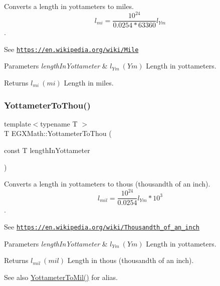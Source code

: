 Converts a length in yottameters to miles. \[ l_{mi}=\frac{10^{24}}{0.0254 * 63360} l_{Ym} \]. 

See \href{https://en.wikipedia.org/wiki/Mile}{\tt https\+://en.\+wikipedia.\+org/wiki/\+Mile} 
\begin{DoxyParams}{Parameters}
{\em length\+In\+Yottameter} & $ l_{Ym}\ (Ym)$ Length in yottameters. \\
\hline
\end{DoxyParams}
\begin{DoxyReturn}{Returns}
$ l_{mi}\ (mi)$ Length in miles. 
\end{DoxyReturn}
\mbox{\label{group___e_g_x_math-_conversions-_length_conversions-_s_i-_yottameter-_imperial_ga9bf8eeca799b8246932d4aeaac425d87}} 
\subsubsection{\texorpdfstring{Yottameter\+To\+Thou()}{YottameterToThou()}}
{\footnotesize\ttfamily template$<$typename T $>$ \\
T E\+G\+X\+Math\+::\+Yottameter\+To\+Thou (\begin{DoxyParamCaption}\item[{const T}]{length\+In\+Yottameter }\end{DoxyParamCaption})}



Converts a length in yottameters to thous (thousandth of an inch). \[ l_{mil}= \frac{10^{24}}{0.0254} l_{Ym} * 10^{3} \]. 

See \href{https://en.wikipedia.org/wiki/Thousandth_of_an_inch}{\tt https\+://en.\+wikipedia.\+org/wiki/\+Thousandth\+\_\+of\+\_\+an\+\_\+inch} 
\begin{DoxyParams}{Parameters}
{\em length\+In\+Yottameter} & $ l_{Ym}\ (Ym)$ Length in yottameters. \\
\hline
\end{DoxyParams}
\begin{DoxyReturn}{Returns}
$ l_{mil}\ (mil)$ Length in thous (thousandth of an inch). 
\end{DoxyReturn}
\begin{DoxySeeAlso}{See also}
\mbox{\hyperlink{group___e_g_x_math-_conversions-_length_conversions-_s_i-_yottameter-_imperial_ga71ee7b2256fffaec2663bd2eafc30a9d}{Yottameter\+To\+Mil()}} for alias. 
\end{DoxySeeAlso}
\mbox{\label{group___e_g_x_math-_conversions-_length_conversions-_s_i-_yottameter-_imperial_ga87f19dee341e81a7bb72bf4a5134935f}} 
